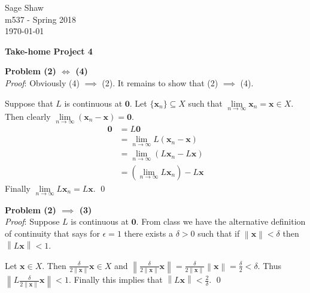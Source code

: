 \documentclass[12pt]{article}
\newcommand{\problem}[1]{\hspace{-4 ex} \large \textbf{Problem #1} }
\newcommand{\norm}[1]{\left\lVert#1\right\rVert}
\renewenvironment{proof}{\hspace{-4 ex} \emph{Proof}:}{\qed}
\renewcommand{\vec}[1]{\boldsymbol{#1}}
\begin{document}
	\thispagestyle{empty}
	
	\begin{flushright}
		Sage Shaw \\
		m537 - Spring 2018 \\
		\today
	\end{flushright}
	
{\large \textbf{Take-home Project 4}}\bigbreak

\problem{(2) $\iff $ (4)} \\
\begin{proof}
	Obviously (4) $\implies$ (2). It remains to show that (2) $\implies$ (4). \bigbreak
	
	Suppose that $L$ is continuous at $\vec{0}$. Let $\{\vec{x}_n\} \subseteq X$ such that $\lim\limits_{n \to \infty} \vec{x}_n = \vec{x} \in X$. Then clearly $\lim\limits_{n \to \infty} (\vec{x}_n - \vec{x}) = \vec{0}$.
	\begin{align*}
	\vec{0} & = L\vec{0} \\
	& = \lim_{n \to \infty} L(\vec{x}_n - \vec{x}) \\
	& = \lim_{n \to \infty} (L\vec{x}_n - L\vec{x}) \\
	& = (\lim_{n \to \infty} L\vec{x}_n) - L\vec{x}
	\end{align*}
	Finally $\lim\limits_{n \to \infty} L\vec{x}_n = L\vec{x}$.	
\end{proof}

\problem{(2) $\implies$ (3)} \\
\begin{proof}
	Suppose $L$ is continuous at $\vec{0}$. From class we have the alternative definition of continuity that says for $\epsilon=1$ there exists a $\delta >0$ such that if $\norm{\vec{x}}<\delta$ then $\norm{L\vec{x}}<1$. \bigbreak
	
	Let $\vec{x} \in X$. Then $\frac{\delta}{2\norm{\vec{x}}}\vec{x} \in X$ and $\norm{\frac{\delta}{2\norm{\vec{x}}}\vec{x}} = \frac{\delta}{2\norm{\vec{x}}}\norm{\vec{x}} = \frac{\delta}{2} < \delta$. Thus $\norm{L\frac{\delta}{2\norm{\vec{x}}}\vec{x}} < 1$. Finally this implies that $\norm{L\vec{x}} < \frac{2}{\delta}$.
\end{proof}
\end{document}
